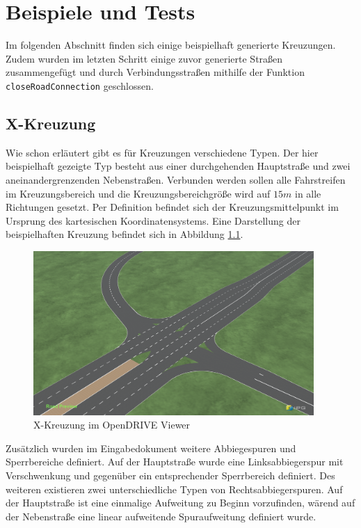 \chapter{Beispiele und Tests}

Im folgenden Abschnitt finden sich einige beispielhaft generierte Kreuzungen. Zudem wurden im letzten Schritt einige zuvor generierte Straßen zusammengefügt und durch Verbindungsstraßen mithilfe der Funktion \texttt{closeRoadConnection} geschlossen.

\section{X-Kreuzung}
Wie schon erläutert gibt es für Kreuzungen verschiedene Typen. Der hier beispielhaft gezeigte Typ besteht aus einer durchgehenden Hauptstraße und zwei aneinandergrenzenden Nebenstraßen. Verbunden werden sollen alle Fahrstreifen im Kreuzungsbereich und die Kreuzungsbereichgröße wird auf \(15 m\) in alle Richtungen gesetzt. Per Definition befindet sich der Kreuzungsmittelpunkt im Ursprung des kartesischen Koordinatensystems. Eine Darstellung der beispielhaften Kreuzung befindet sich in Abbildung \ref{abb6}.

\begin{figure}[H]
\flushleft
\includegraphics[width=0.95\textwidth]{fig/junction4.png}
\caption{X-Kreuzung im OpenDRIVE Viewer}
\label{abb6}
\end{figure}

Zusätzlich wurden im Eingabedokument weitere Abbiegespuren und Sperrbereiche definiert. Auf der Hauptstraße wurde eine Linksabbiegerspur mit Verschwenkung und gegenüber ein entsprechender Sperrbereich definiert. Des weiteren existieren zwei unterschiedliche Typen von Rechtsabbiegerspuren. Auf der Hauptstraße ist eine einmalige Aufweitung zu Beginn vorzufinden, wärend auf der Nebenstraße eine linear aufweitende Spuraufweitung definiert wurde. 

